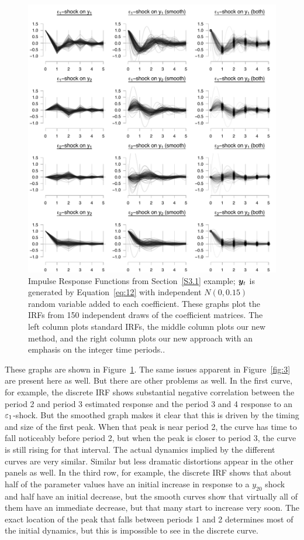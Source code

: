 \documentclass[AER,reviewmode]{tex/AEA}
\begin{document}
\begin{figure}[t]
  \centering
  \includegraphics[width=5.5in]{graphs/numeric2.pdf}
  \caption{Impulse Response Functions from Section~\ref{S3.1} example;
    $\bm{y}_t$ is generated by Equation~\eqref{eq:12} with independent
    $N(0,0.15)$ random variable added to each coefficient. These
    graphs plot the IRFs from 150 independent draws of the
    coefficient matrices. The left column plots standard IRFs, the
    middle column plots our new method, and the right column plots our
    new approach with an emphasis on the integer time periods..}
  \label{fig:4}
\end{figure}

These graphs are shown in Figure~\ref{fig:4}. The same issues apparent
in Figure~\ref{fig:3} are present here as well. But there are other
problems as well. In the first curve, for example, the discrete IRF
shows substantial negative correlation between the period 2 and period
3 estimated response and the period 3 and 4 response to an
$\varepsilon_1$-shock. But the smoothed graph makes it clear that this is
driven by the timing and size of the first peak. When that peak is
near period 2, the curve has time to fall noticeably before period 2,
but when the peak is closer to period 3, the curve is still rising for
that interval. The actual dynamics implied by the different curves are
very similar. Similar but less dramatic distortions appear in the
other panels as well. In the third row, for example, the discrete
IRF shows that about half of the parameter values have an initial
increase in response to a $y_{20}$ shock and half have an initial
decrease, but the smooth curves show that virtually all of them have
an immediate decrease, but that many start to increase very soon. The
exact location of the peak that falls between periods 1 and 2
determines most of the initial dynamics, but this is impossible to see
in the discrete curve.
\end{document}
